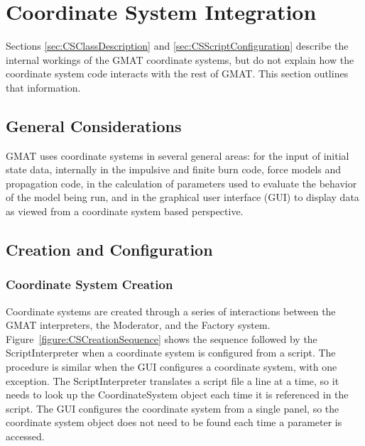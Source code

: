 \section{Coordinate System Integration }

Sections \ref{sec:CSClassDescription} and \ref{sec:CSScriptConfiguration} describe the internal
workings of the GMAT coordinate systems, but do not explain how the coordinate system code interacts
with the rest of GMAT. This section outlines that information.


\subsection{General Considerations}

GMAT uses coordinate systems in several general areas: for the input of initial state data,
internally in the impulsive and finite burn code, force models and propagation code, in the
calculation of parameters used to evaluate the behavior of the model being run, and in the graphical
user interface (GUI) to display data as viewed from a coordinate system based perspective.

\subsection{Creation and Configuration}

\subsubsection{Coordinate System Creation}

Coordinate systems are created through a series of interactions between the GMAT interpreters, the
Moderator, and the Factory system. Figure~\ref{figure:CSCreationSequence} shows the sequence
followed by the ScriptInterpreter when a coordinate system is configured from a script.  The
procedure is similar when the GUI configures a coordinate system, with one exception. The
ScriptInterpreter translates a script file a line at a time, so it needs to look up the
CoordinateSystem object each time it is referenced in the script. The GUI configures the coordinate
system from a single panel, so the coordinate system object does not need to be found each time a
parameter is accessed.

